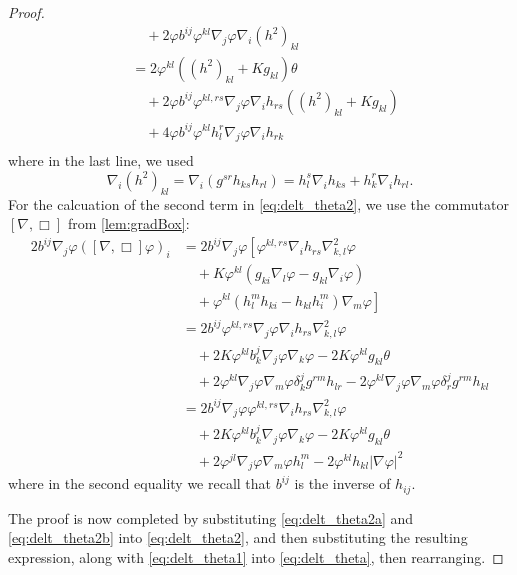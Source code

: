 \documentclass{amsart}
\begin{document}
\begin{proof}
\begin{equation}
\begin{split}
&\quad + 2 \varphi b^{ij} \varphi^{kl} \nabla_j \varphi \nabla_i (h^2)_{kl} \\
&= 2 \varphi^{kl}((h^2)_{kl} + K g_{kl}) \theta \\
&\quad + 2 \varphi b^{ij} \varphi^{kl,rs} \nabla_j \varphi \nabla_i h_{rs} ((h^2)_{kl} + K g_{kl}) \\
&\quad + 4 \varphi b^{ij} \varphi^{kl} h^r_l \nabla_j \varphi \nabla_i h_{rk} \\
\end{split}
\end{equation}
where in the last line, we used
\[
\nabla_i (h^2)_{kl} = \nabla_i (g^{sr} h_{ks} h_{rl}) = h^s_l \nabla_i h_{ks} + h^r_k \nabla_i h_{rl}.
\]
For the calcuation of the second term in \cref{eq:delt_theta2}, we use the commutator \([\nabla, \Box]\) from \cref{lem:gradBox}:
\begin{equation}
\label{eq:delt_theta2b}
\begin{split}
2 b^{ij} \nabla_j \varphi ([\nabla, \Box] \varphi)_i &= 2 b^{ij} \nabla_j \varphi \left[\varphi^{kl,rs} \nabla_i h_{rs} \nabla^2_{k,l} \varphi \right. \\
&\quad + K \varphi^{kl} \left(g_{ki} \nabla_l \varphi - g_{kl} \nabla_i \varphi\right) \\
&\quad + \left. \varphi^{kl}\left(h^{m}_{l}h_{ki} - h_{kl}h^{m}_{i}\right) \nabla_m \varphi\right]  \\
&= 2 b^{ij} \varphi^{kl,rs} \nabla_j \varphi \nabla_i h_{rs} \nabla^2_{k,l} \varphi \\
&\quad + 2 K \varphi^{kl} b^j_k \nabla_j \varphi \nabla_k \varphi - 2K \varphi^{kl}g_{kl} \theta \\
&\quad + 2\varphi^{kl} \nabla_j \varphi \nabla_m \varphi \delta^j_k g^{rm} h_{lr} - 2\varphi^{kl} \nabla_j \varphi \nabla_m \varphi \delta^j_r g^{rm} h_{kl} \\
&= 2 b^{ij} \nabla_j \varphi \varphi^{kl,rs} \nabla_i h_{rs} \nabla^2_{k,l} \varphi \\
&\quad + 2 K \varphi^{kl} b^j_k \nabla_j \varphi \nabla_k \varphi - 2K \varphi^{kl}g_{kl} \theta \\
&\quad + 2\varphi^{jl} \nabla_j \varphi \nabla_m \varphi h^m_l - 2\varphi^{kl} h_{kl} |\nabla \varphi|^2
\end{split}
\end{equation}
where in the second equality we recall that \(b^{ij}\) is the inverse of \(h_{ij}\).

The proof is now completed by substituting \cref{eq:delt_theta2a} and \cref{eq:delt_theta2b} into \cref{eq:delt_theta2}, and then substituting the resulting expression, along with \cref{eq:delt_theta1} into \cref{eq:delt_theta}, then rearranging.
\end{proof}
\end{document}
